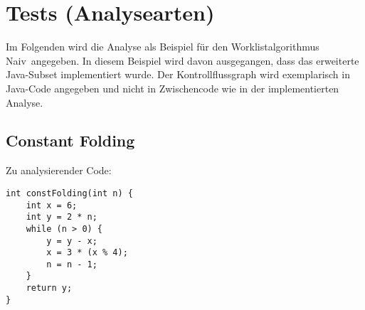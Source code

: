 \section{Tests (Analysearten)}

Im Folgenden wird die Analyse als Beispiel für den Worklistalgorithmus \glqq Naiv\grqq\ angegeben.
In diesem Beispiel wird davon ausgegangen, dass das erweiterte Java-Subset implementiert wurde.
Der Kontrollflussgraph wird exemplarisch in Java-Code angegeben und nicht in Zwischencode wie in der implementierten Analyse.


\subsection{Constant Folding}

Zu analysierender Code: \par

\begin{lstlisting}[frame=single]
int constFolding(int n) {
	int x = 6;
	int y = 2 * n;
	while (n > 0) {
		y = y - x;
		x = 3 * (x % 4);
		n = n - 1;
	}
	return y;
}
\end{lstlisting}

\par

